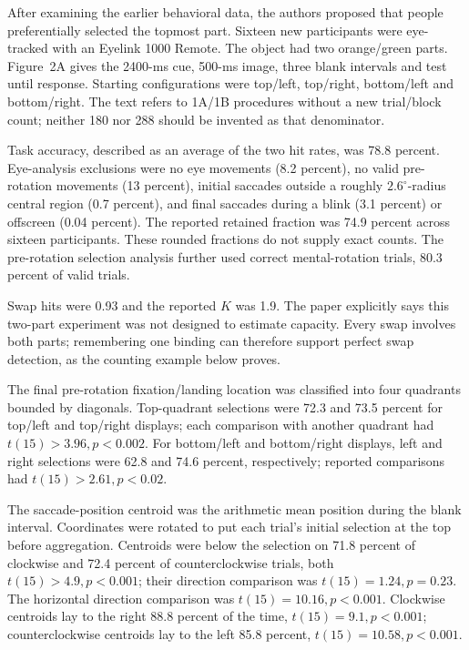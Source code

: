 After examining the earlier behavioral data, the authors proposed
that people preferentially selected the topmost part.
Sixteen new participants were eye-tracked with an Eyelink 1000
Remote. The object had two orange/green parts.
Figure~2A gives the 2400-ms cue, 500-ms image, three blank
intervals and test until response. Starting configurations
were top/left, top/right, bottom/left and bottom/right.
The text refers to 1A/1B procedures without a new trial/block
count; neither 180 nor 288 should be invented as that denominator.

Task accuracy, described as an average of the two hit rates,
was 78.8 percent. Eye-analysis exclusions were no eye movements
(8.2 percent), no valid pre-rotation movements (13 percent),
initial saccades outside a roughly \(2.6^\circ\)-radius central
region (0.7 percent), and final saccades during a blink
(3.1 percent) or offscreen (0.04 percent).
The reported retained fraction was 74.9 percent across sixteen
participants. These rounded fractions do not supply exact counts.
The pre-rotation selection analysis further used correct
mental-rotation trials, 80.3 percent of valid trials.

Swap hits were 0.93 and the reported \(K\) was 1.9.
The paper explicitly says this two-part experiment was not
designed to estimate capacity. Every swap involves both parts;
remembering one binding can therefore support perfect swap
detection, as the counting example below proves.

The final pre-rotation fixation/landing location was classified
into four quadrants bounded by diagonals.
Top-quadrant selections were 72.3 and 73.5 percent for
top/left and top/right displays; each comparison with another
quadrant had \(t(15)>3.96,p<0.002\).
For bottom/left and bottom/right displays, left and right
selections were 62.8 and 74.6 percent, respectively;
reported comparisons had \(t(15)>2.61,p<0.02\).

The saccade-position centroid was the arithmetic mean position
during the blank interval. Coordinates were rotated to put
each trial's initial selection at the top before aggregation.
Centroids were below the selection on 71.8 percent of clockwise
and 72.4 percent of counterclockwise trials, both
\(t(15)>4.9,p<0.001\); their direction comparison was
\(t(15)=1.24,p=0.23\).
The horizontal direction comparison was
\(t(15)=10.16,p<0.001\).
Clockwise centroids lay to the right 88.8 percent of the time,
\(t(15)=9.1,p<0.001\); counterclockwise centroids lay to
the left 85.8 percent, \(t(15)=10.58,p<0.001\).

